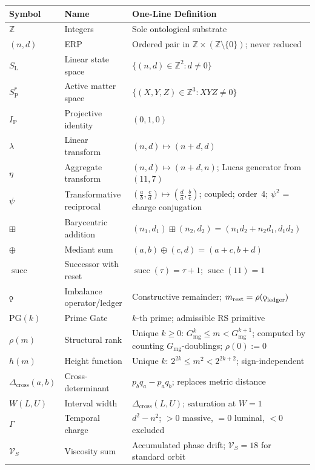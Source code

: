 \documentclass[11pt, letterpaper]{article}
\newcommand{\Z}{\mathbb{Z}}
\newcommand{\SL}{S_{\mathrm{L}}}
\newcommand{\SPs}{S_{\mathrm{P}}^{*}}
\newcommand{\IP}{I_{\mathrm{P}}}
\newcommand{\lop}{\lambda}
\newcommand{\aop}{\eta}
\newcommand{\bplus}{\boxplus}
\newcommand{\med}{\oplus}
\renewcommand{\succ}{\operatorname{succ}}
\newcommand{\rank}{\rho}
\newcommand{\hfn}{h}
\newcommand{\Dcross}{\Delta_{\mathrm{cross}}}
\newcommand{\koppa}{\mathbin{\text{\rm\k{o}}}}
\newcommand{\Tcharge}{\Gamma}
\newcommand{\VS}{\mathcal{V}_S}
\newcommand{\PG}{\mathrm{PG}}
\theoremstyle{definition}
\theoremstyle{plain}
\begin{document}
\begin{longtable}{L{2.2cm} L{5.5cm} L{5.5cm}}
\toprule
\textbf{Symbol} & \textbf{Name} & \textbf{One-Line Definition} \\
\midrule\endhead\bottomrule\endfoot

$\Z$ & Integers & Sole ontological substrate \\
$(n,d)$ & ERP & Ordered pair in $\Z\times(\Z\setminus\{0\})$; never reduced \\
$\SL$ & Linear state space & $\{(n,d)\in\Z^2:d\neq 0\}$ \\
$\SPs$ & Active matter space & $\{(X,Y,Z)\in\Z^3:XYZ\neq 0\}$ \\
$\IP$ & Projective identity & $(0,1,0)$ \\
$\lop$ & Linear transform & $(n,d)\mapsto(n+d,d)$ \\
$\aop$ & Aggregate transform & $(n,d)\mapsto(n+d,n)$; Lucas generator from $(11,7)$ \\
$\psi$ & Transformative reciprocal &
  $\left(\tfrac{a}{b},\tfrac{c}{d}\right)\mapsto\left(\tfrac{d}{a},\tfrac{b}{c}\right)$;
  coupled; order~4; $\psi^2$ = charge conjugation \\
$\bplus$ & Barycentric addition &
  $(n_1,d_1)\bplus(n_2,d_2)=(n_1 d_2+n_2 d_1,d_1 d_2)$ \\
$\med$ & Mediant sum & $(a,b)\med(c,d)=(a+c,b+d)$ \\
$\succ$ & Successor with reset & $\succ(\tau)=\tau+1$; $\succ(11)=1$ \\
$\koppa$ & Imbalance operator/ledger &
  Constructive remainder; $m_{\mathrm{rest}}=\rank(\koppa_{\mathrm{ledger}})$ \\
$\PG(k)$ & Prime Gate & $k$-th prime; admissible RS primitive \\
$\rank(m)$ & Structural rank &
  Unique $k\geq 0$: $G_{\mathrm{mg}}^k\leq m < G_{\mathrm{mg}}^{k+1}$;
  computed by counting $G_{\mathrm{mg}}$-doublings; $\rank(0):=0$ \\
$\hfn(m)$ & Height function &
  Unique $k$: $2^{2k}\leq m^2<2^{2k+2}$; sign-independent \\
$\Dcross(a,b)$ & Cross-determinant & $p_b q_a-p_a q_b$; replaces metric distance \\
$W(L,U)$ & Interval width & $\Dcross(L,U)$; saturation at $W=1$ \\
$\Tcharge$ & Temporal charge & $d^2-n^2$; $>0$ massive, $=0$ luminal, $<0$ excluded \\
$\VS$ & Viscosity sum & Accumulated phase drift; $\VS=18$ for standard orbit \\

\end{longtable}
\end{document}
